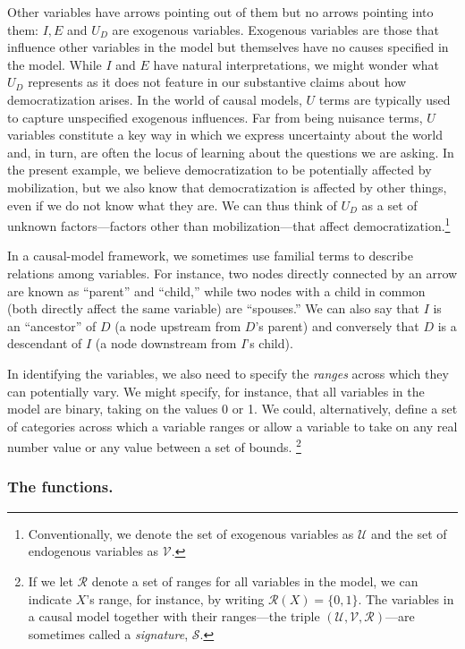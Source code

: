 \documentclass[12pt,]{book}
\let\rmarkdownfootnote\footnote%
\def\footnote{\protect\rmarkdownfootnote}
\begin{document}
Other variables have arrows pointing out of them but no arrows pointing into them: \(I, E\) and \(U_D\) are exogenous variables. Exogenous variables are those that influence other variables in the model but themselves have no causes specified in the model. While \(I\) and \(E\) have natural interpretations, we might wonder what \(U_D\) represents as it does not feature in our substantive claims about how democratization arises. In the world of causal models, \(U\) terms are typically used to capture unspecified exogenous influences. Far from being nuisance terms, \(U\) variables constitute a key way in which we express uncertainty about the world and, in turn, are often the locus of learning about the questions we are asking. In the present example, we believe democratization to be potentially affected by mobilization, but we also know that democratization is affected by other things, even if we do not know what they are. We can thus think of \(U_D\) as a set of unknown factors---factors other than mobilization---that affect democratization.\footnote{Conventionally, we denote the set of exogenous variables as \(\mathcal{U}\) and the set of endogenous variables as \(\mathcal{V}\).}

In a causal-model framework, we sometimes use familial terms to describe relations among variables. For instance, two nodes directly connected by an arrow are known as ``parent'' and ``child,'' while two nodes with a child in common (both directly affect the same variable) are ``spouses.'' We can also say that \(I\) is an ``ancestor'' of \(D\) (a node upstream from \(D\)'s parent) and conversely that \(D\) is a descendant of \(I\) (a node downstream from \(I\)'s child).

In identifying the variables, we also need to specify the \emph{ranges} across which they can potentially vary. We might specify, for instance, that all variables in the model are binary, taking on the values 0 or 1. We could, alternatively, define a set of categories across which a variable ranges or allow a variable to take on any real number value or any value between a set of bounds. \footnote{If we let \(\mathcal{R}\) denote a set of ranges for all variables in the model, we can indicate \(X\)'s range, for instance, by writing \(\mathcal{R}(X)=\{0,1\}\). The variables in a causal model together with their ranges---the triple \((\mathcal{U}, \mathcal{V}, \mathcal{R})\)---are sometimes called a \emph{signature}, \(\mathcal{S}\).}

\hypertarget{the-functions.}{%
\subsubsection{The functions.}\label{the-functions.}}
\end{document}
